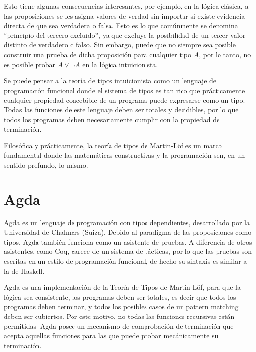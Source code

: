 Esto tiene algunas consecuencias interesantes, por ejemplo, en la lógica clásica, a las proposiciones se les asigna valores de verdad sin importar si existe evidencia directa de que sea verdadera o falsa.
Esto es lo que comúnmente se denomina ``principio del tercero excluido'', ya que excluye la posibilidad de un tercer valor distinto de verdadero o falso.
Sin embargo, puede que no siempre sea posible construir una prueba de dicha proposición para cualquier tipo $A$, por lo tanto, no es posible probar $A \vee \neg A$ en la lógica intuicionista.


Se puede pensar a la teoría de tipos intuicionista como un lenguaje de programación funcional donde el sistema de tipos es tan rico que prácticamente cualquier propiedad concebible de un programa puede expresarse como un tipo.
Todas las funciones de este lenguaje deben ser totales y decidibles, por lo que todos los programas deben necesariamente cumplir con la propiedad de terminación.

Filosófica y prácticamente, la teoría de tipos de Martin-Löf es un marco fundamental donde las matemáticas constructivas y la programación son, en un sentido profundo, lo mismo.


\section{Agda}
Agda es un lenguaje de programación con tipos dependientes, desarrollado por la Universidad de
Chalmers (Suiza).
Debido al paradigma de las proposiciones como tipos, Agda también funciona como un asistente de pruebas.
A diferencia de otros asistentes, como Coq, carece de un sistema de tácticas, por lo que las pruebas son escritas en un estilo de programación funcional, de hecho su sintaxis es similar a la de Haskell.

Agda es una implementación de la Teoría de Tipos de Martin-Löf, para que la lógica sea consistente, los programas deben ser totales, es decir que todos los programas deben terminar, y todos los posibles casos de un pattern matching deben ser cubiertos.
Por este motivo, no todas las funciones recursivas están permitidas, Agda posee un mecanismo de comprobación de terminación que acepta aquellas funciones para las que puede probar mecánicamente su terminación.


